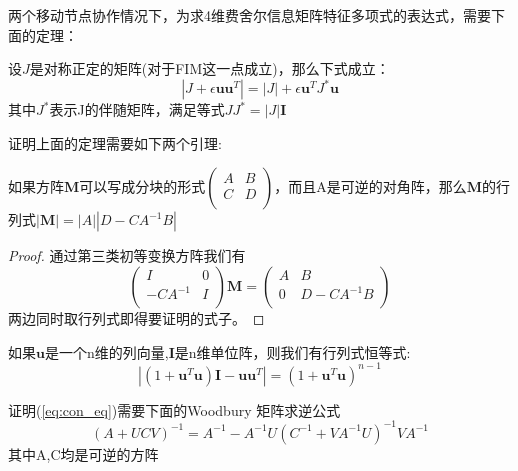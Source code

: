 两个移动节点协作情况下，为求4维费舍尔信息矩阵特征多项式的表达式，需要下面的定理：
\begin{theorem}\label{thm:ShenIden}
设$J$是对称正定的矩阵(对于FIM这一点成立)，那么下式成立：
\begin{equation}\label{eq:ShenIden}
|J+\epsilon \bm{u}\bm{u}^T|=|J|+\epsilon \bm{u}^TJ^*\bm{u}
\end{equation}
其中$J^*$表示J的伴随矩阵，满足等式$JJ^*=|J|\bm{I}$
\end{theorem}
证明上面的定理需要如下两个引理:
\begin{lemma}\label{lemma:block}
如果方阵$\bm{M}$可以写成分块的形式$\left(\begin{array}{cc}
A&B\\
C&D\\
\end{array}\right)$，而且A是可逆的对角阵，那么$\bm{M}$的行列式$|\bm{M}|=|A||D-CA^{-1}B|$
\end{lemma}


\begin{proof}
通过第三类初等变换方阵我们有\[
\left(\begin{array}{cc}
I&0\\
-CA^{-1}&I\\
\end{array}\right) \bm{M}=\left(\begin{array}{cc}
A&B\\
0&D-CA^{-1}B\\
\end{array}\right)\]
两边同时取行列式即得要证明的式子。
\end{proof}
\begin{lemma}
如果$\bm{u}$是一个n维的列向量,$\bm{I}$是n维单位阵，则我们有行列式恒等式:
\begin{equation}\label{eq:con_eq}
|(1+\bm{u}^T\bm{u})\bm{I}-\bm{u}\bm{u}^T|=(1+\bm{u}^T\bm{u})^{n-1}
\end{equation}
\end{lemma}
证明(\ref{eq:con_eq})需要下面的Woodbury 矩阵求逆公式
\begin{equation}\label{eq:woodbury}
(A+UCV)^{-1}=A^{-1}-A^{-1}U(C^{-1}+VA^{-1}U)^{-1}VA^{-1}
\end{equation}
其中A,C均是可逆的方阵


